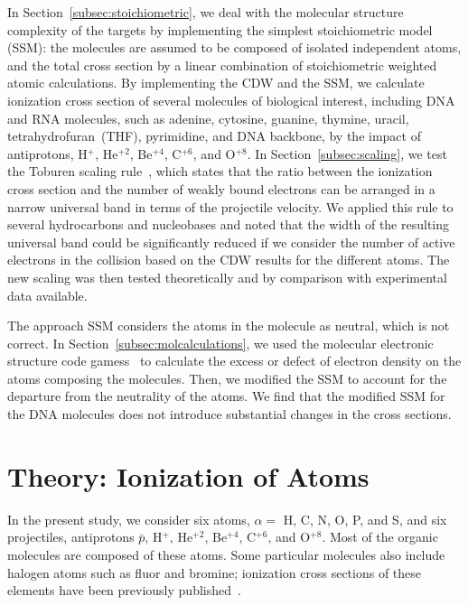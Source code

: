 \documentclass[preprint,showpacs]{revtex4}
\begin{document}
In Section~\ref{subsec:stoichiometric}, we deal with the molecular 
structure complexity of the targets by 
implementing the simplest stoichiometric model (SSM): the molecules are 
assumed to be composed of isolated independent atoms, and the total 
cross section by a linear combination of stoichiometric weighted atomic 
calculations.
By implementing the CDW and the SSM, we calculate ionization 
cross section of several molecules of biological interest, including 
DNA and RNA molecules, such as adenine, cytosine, guanine, thymine, uracil, 
tetrahydrofuran~(THF), pyrimidine, and DNA backbone, by the impact 
of antiprotons, H$^{+}$, He$^{+2}$, Be$^{+4}$, C$^{+6}$, and O$^{+8}$. 
In Section~\ref{subsec:scaling}, we
test the Toburen scaling rule~\cite{toburen1975,toburen1976}, which 
states that the ratio between the ionization cross section and the 
number of weakly bound electrons can be arranged in a narrow universal 
band in terms of the projectile velocity. We applied this rule to 
several hydrocarbons and nucleobases and noted that the width of the 
resulting universal band could be significantly reduced if we consider 
the number of active electrons in the collision based on the 
CDW results for the different atoms. The new scaling was then tested 
theoretically and by comparison with experimental data available.

The approach SSM considers the atoms in the molecule as neutral, 
which is not correct. In Section~\ref{subsec:molcalculations}, 
we used the molecular electronic structure code 
{\sc gamess}~\cite{gamess} to calculate the excess or defect of 
electron density on the atoms composing the molecules. Then, we modified 
the SSM to account for the departure from the neutrality of the atoms. 
We find that the modified SSM for the DNA molecules does not introduce 
substantial changes in the cross sections.

\section{Theory: Ionization of Atoms}
\label{sec:atoms}

In the present study, we consider six atoms, $\alpha=$ H, C, N, O, P, 
and S, and six projectiles, antiprotons $\bar{p}$, H$^{+}$, He$^{+2}$, 
Be$^{+4}$, C$^{+6}$, and O$^{+8}$. 
Most of the organic molecules are composed of these atoms. Some 
particular molecules also include halogen atoms such as fluor and 
bromine; ionization cross sections of these elements have been 
previously published~\cite{miraglia2008}.
\end{document}
